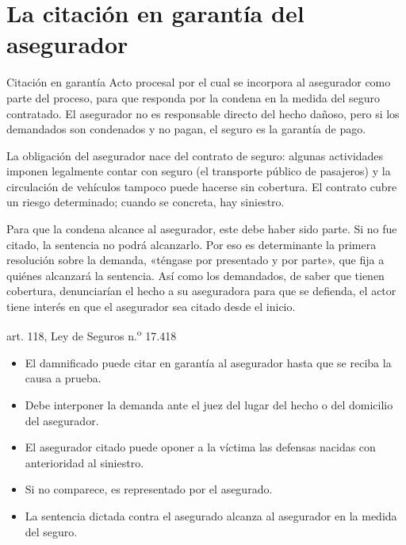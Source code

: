 \documentclass[12pt,oneside]{book}
\begin{document}
\section{La citación en garantía del asegurador}

\begin{definicion}{Citación en garantía}
Acto procesal por el cual se incorpora al asegurador como parte del proceso, para que responda por la condena en la medida del seguro contratado. El asegurador no es responsable directo del hecho dañoso, pero si los demandados son condenados y no pagan, el seguro es la garantía de pago.
\end{definicion}

La obligación del asegurador nace del contrato de seguro: algunas actividades imponen legalmente contar con seguro (el transporte público de pasajeros) y la circulación de vehículos tampoco puede hacerse sin cobertura. El contrato cubre un riesgo determinado; cuando se concreta, hay siniestro.

\begin{importante}
Para que la condena alcance al asegurador, este debe haber sido parte. Si no fue citado, la sentencia no podrá alcanzarlo. Por eso es determinante la primera resolución sobre la demanda, «téngase por presentado y por parte», que fija a quiénes alcanzará la sentencia. Así como los demandados, de saber que tienen cobertura, denunciarían el hecho a su aseguradora para que se defienda, el actor tiene interés en que el asegurador sea citado desde el inicio.
\end{importante}

\begin{regla}{art. 118, Ley de Seguros n.\textsuperscript{o} 17.418}
\begin{itemize}
\item El damnificado puede citar en garantía al asegurador hasta que se reciba la causa a prueba.
\item Debe interponer la demanda ante el juez del lugar del hecho o del domicilio del asegurador.
\item El asegurador citado puede oponer a la víctima las defensas nacidas con anterioridad al siniestro.
\item Si no comparece, es representado por el asegurado.
\item La sentencia dictada contra el asegurado alcanza al asegurador en la medida del seguro.
\end{itemize}
\end{regla}
\end{document}
